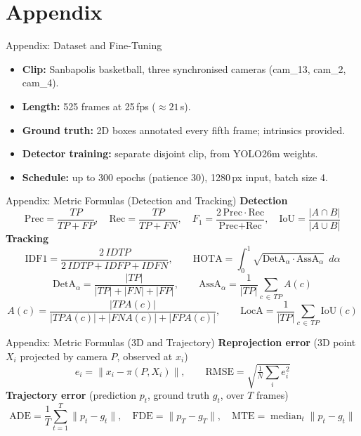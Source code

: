\section*{Appendix}

\begin{frame}{Appendix: Dataset and Fine-Tuning}
\begin{itemize}
  \item \textbf{Clip:} Sanbapolis basketball, three synchronised cameras (cam\_13, cam\_2, cam\_4).
  \item \textbf{Length:} 525 frames at 25\,fps ($\approx 21$\,s).
  \item \textbf{Ground truth:} 2D boxes annotated every fifth frame; intrinsics provided.
  \item \textbf{Detector training:} separate disjoint clip, from YOLO26m weights.
  \item \textbf{Schedule:} up to 300 epochs (patience 30), 1280\,px input, batch size 4.
\end{itemize}
\end{frame}

\begin{frame}{Appendix: Metric Formulas (Detection and Tracking)}
\textbf{Detection}
\[
\text{Prec} = \frac{TP}{TP+FP}, \quad
\text{Rec} = \frac{TP}{TP+FN}, \quad
F_1 = \frac{2\,\text{Prec}\cdot\text{Rec}}{\text{Prec}+\text{Rec}}, \quad
\text{IoU} = \frac{|A \cap B|}{|A \cup B|}
\]
\textbf{Tracking} 
\[
\text{IDF1} = \frac{2\,IDTP}{2\,IDTP + IDFP + IDFN}, \qquad
\text{HOTA} = \int_0^1 \sqrt{\text{DetA}_\alpha\cdot\text{AssA}_\alpha}\;\,d\alpha
\]
\[
\text{DetA}_\alpha = \frac{|TP|}{|TP|+|FN|+|FP|}, \qquad
\text{AssA}_\alpha = \frac{1}{|TP|}\sum_{c\,\in\,TP} A(c)
\]
\[
A(c) = \frac{|TPA(c)|}{|TPA(c)|+|FNA(c)|+|FPA(c)|}, \qquad
\text{LocA} = \frac{1}{|TP|}\sum_{c\,\in\,TP}\text{IoU}(c)
\]
\end{frame}

\begin{frame}{Appendix: Metric Formulas (3D and Trajectory)}
\textbf{Reprojection error} (3D point $X_i$ projected by camera $P$, observed at $x_i$)
\[
e_i = \lVert x_i - \pi(P, X_i)\rVert, \qquad
\text{RMSE} = \sqrt{\tfrac{1}{N}\textstyle\sum_i e_i^{2}}
\]
\textbf{Trajectory error} (prediction $p_t$, ground truth $g_t$, over $T$ frames)
\[
\text{ADE} = \frac{1}{T}\sum_{t=1}^{T}\lVert p_t - g_t\rVert, \quad
\text{FDE} = \lVert p_T - g_T\rVert, \quad
\text{MTE} = \operatorname{median}_t \lVert p_t - g_t\rVert
\]
\end{frame}

